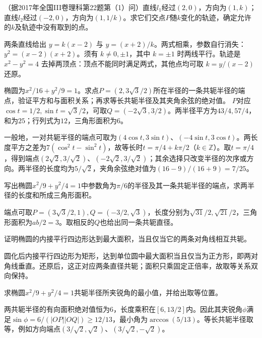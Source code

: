 （据2017年全国III卷理科第22题第（1）问）直线\(l_1\)经过\((2,0)\)，方向为\((1,k)\)；直线\(l_2\)经过\((-2,0)\)，方向为\((1,1/k)\)。求它们交点\(P\)随\(k\)变化的轨迹，确定允许的\(k\)及轨迹中没有取到的点。
\par
\solutionanswer
两条直线给出 \(y=k(x-2)\) 与 \(y=(x+2)/k\)。两式相乘，参数自行消失：\(y^2=(x-2)(x+2)\)。须有 \(k\ne0,\pm1\)，其中 \(k=\pm1\) 时两线平行。轨迹是 \(x^2-y^2=4\) 去掉两顶点：顶点不能同时满足两式，其他点均可取 \(k=y/(x-2)\) 还原。


椭圆为\(x^2/16+y^2/9=1\)。求点\(P=(2,3\sqrt3/2)\)所在半径的一条共轭半径的端点，验证平方和与面积关系；再求等长共轭半径及其夹角余弦的绝对值。
\solutionanswer
\(P\)对应\(\cos t=1/2,\sin t=\sqrt3/2\)，可取\(Q=(-2\sqrt3,3/2)\)。两半径平方为\(43/4,57/4\)，和为\(25\)；行列式为\(12\)，三角形面积为\(6\)。

一般地，一对共轭半径的端点可取为\((4\cos t,3\sin t)\)、\((-4\sin t,3\cos t)\)。两长度平方之差为\(7(\cos^2t-\sin^2t)\)，故等长时\(t=\pi/4+k\pi/2\)（\(k\in\mathbb Z\)）。取\(t=\pi/4\)，得到端点\((2\sqrt2,3/\sqrt2)\)、\((-2\sqrt2,3/\sqrt2)\)；其余选择只改变半径的次序或方向。两半径的长度均为\(5/\sqrt2\)，夹角余弦绝对值为\((16-9)/(16+9)=7/25\)。


写出椭圆\(x^2/9+y^2/4=1\)中参数角为\(\pi/6\)的半径及其一条共轭半径的端点，求两半径的长度和所成三角形面积。
\par
\solutionanswer
端点可取\(P=(3\sqrt3/2,1),Q=(-3/2,\sqrt3)\)，长度分别为\(\sqrt{31}/2,\sqrt{21}/2\)，三角形面积为\(ab/2=3\)。取相反的\(Q\)也给出同一条共轭直径。


证明椭圆的内接平行四边形达到最大面积，当且仅当它的两条对角线相互共轭。
\par
\solutionanswer
圆化后内接平行四边形为矩形，达到单位圆中最大面积当且仅当为正方形，即两对角线垂直。还原后，这正对应两条直径共轭；面积只乘固定正倍率，故取等关系双向保持。


求椭圆\(x^2/9+y^2/4=1\)共轭半径所夹锐角的最小值，并给出取等位置。
\par
\solutionanswer
两共轭半径的有向面积绝对值恒为\(6\)，长度乘积在\([6,13/2]\)内。因此其夹锐角\(\phi\)满足\(\sin\phi=6/(|OP||OQ|)\ge12/13\)，最小角为\(\arccos(5/13)\)。等长共轭半径取等，例如方向端点\((3/\sqrt2,\sqrt2)\)、\((3/\sqrt2,-\sqrt2)\)。


